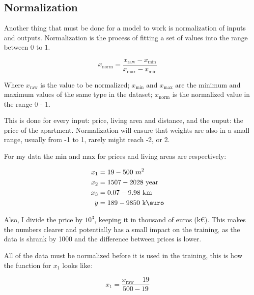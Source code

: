 \documentclass{article}
\begin{document}
\subsection{Normalization}

Another thing that must be done for a model to work is normalization of inputs and outputs.
Normalization is the process of fitting a set of values into the range between
0 to 1.

\begin{equation}
x_{\mathrm{norm}} = \frac{x_{\mathrm{raw}} - x_{\min}}{x_{\max} - x_{\min}}
\end{equation}


Where $x_{\mathrm{raw}}$ is the value to be normalized; $x_{\min}$ and $x_{\max}$
are the minimum and maximum values of the same type in the dataset; $x_{\mathrm{norm}}$
is the normalized value in the range 0 - 1.


This is done for every input: price, living area and distance, and the ouput: the
price of the apartment.
Normalization will ensure that weights are also in a small range, usually from -1 to 1,
rarely might reach -2, or 2.

For my data the min and max for prices and living areas are respectively:

\[
\begin{split}
x_1 &= 19 - 500 \text{ $m^2$} \\
x_2 &= 1507 - 2028 \text{ year} \\
x_3 &= 0.07 - 9.98 \text{ km} \\
y &= 189 - 9850 \text{ k\euro}
\end{split}
\]

Also, I divide the price by $10^{3}$, keeping it in thousand of euros (k\euro).
This makes the numbers clearer and potentially has a small impact on the training,
as the data is shrank by 1000 and the difference between prices is lower.

All of the data must be normalized before it is used in the training, this is
how the function for $x_1$ looks like:

\[
x_1 = \frac{x_{\mathrm{raw}} - 19}{500 - 19}
\]



\end{document}
